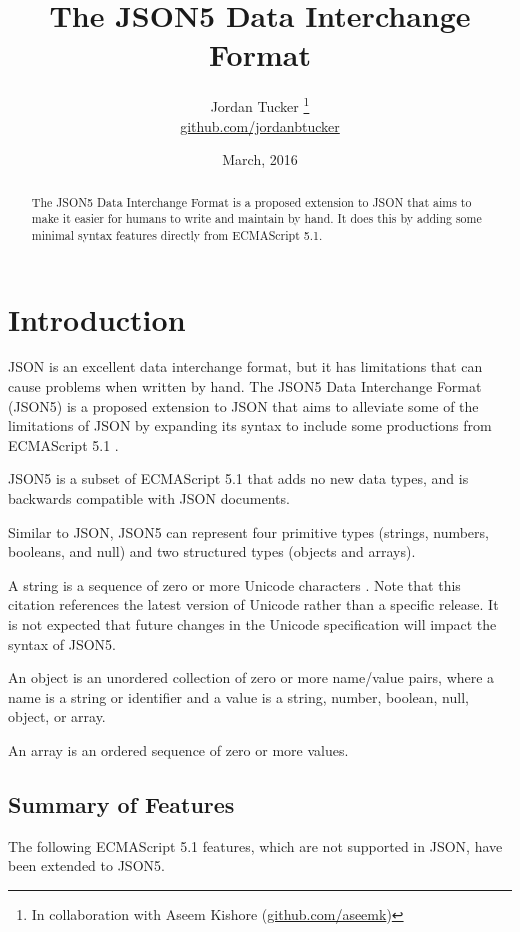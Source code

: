 \documentclass{article}
\title{The JSON5 Data Interchange Format}
\author{
	Jordan Tucker
	\thanks{
		In collaboration with Aseem Kishore
		(\href{https://github.com/aseemk}{github.com/aseemk})
	}\\
	\href{https://github.com/jordanbtucker}{github.com/jordanbtucker}
}
\date{March, 2016}
\begin{document}
\maketitle

\begin{abstract}
The JSON5 Data Interchange Format is a proposed extension to JSON that aims to make it easier for humans to write and maintain by hand. It does this by adding some minimal syntax features directly from ECMAScript 5.1.
\end{abstract}

\tableofcontents

\section{Introduction}

JSON \cite{json} \cite{rfc7159} is an excellent data interchange format, but it has limitations that can cause problems when written by hand. The JSON5 Data Interchange Format (JSON5) is a proposed extension to JSON that aims to alleviate some of the limitations of JSON by expanding its syntax to include some productions from ECMAScript 5.1 \cite{es5}.

JSON5 is a subset of ECMAScript 5.1 that adds no new data types, and is backwards compatible with JSON documents.

Similar to JSON, JSON5 can represent four primitive types (strings, numbers, booleans, and null) and two structured types (objects and arrays).

A string is a sequence of zero or more Unicode characters \cite{unicode}. Note that this citation references the latest version of Unicode rather than a specific release. It is not expected that future changes in the Unicode specification will impact the syntax of JSON5.

An object is an unordered collection of zero or more name/value pairs, where a name is a string or identifier and a value is a string, number, boolean, null, object, or array.

An array is an ordered sequence of zero or more values.

\subsection{Summary of Features}

The following ECMAScript 5.1 features, which are not supported in JSON, have been extended to JSON5.
\end{document}

